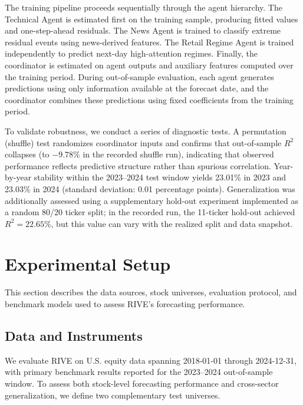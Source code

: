\documentclass[review]{elsarticle}
\begin{document}
The training pipeline proceeds sequentially through the agent hierarchy. The Technical Agent is estimated first on the training sample, producing fitted values and one-step-ahead residuals. The News Agent is trained to classify extreme residual events using news-derived features. The Retail Regime Agent is trained independently to predict next-day high-attention regimes. Finally, the coordinator is estimated on agent outputs and auxiliary features computed over the training period. During out-of-sample evaluation, each agent generates predictions using only information available at the forecast date, and the coordinator combines these predictions using fixed coefficients from the training period. %

To validate robustness, we conduct a series of diagnostic tests. A permutation (shuffle) test randomizes coordinator inputs and confirms that out-of-sample $R^2$ collapses (to $-9.78\%$ in the recorded shuffle run), indicating that observed performance reflects predictive structure rather than spurious correlation. %
Year-by-year stability within the 2023--2024 test window yields 23.01\% in 2023 and 23.03\% in 2024 (standard deviation: 0.01 percentage points). %
Generalization was additionally assessed using a supplementary hold-out experiment implemented as a random 80/20 ticker split; in the recorded run, the 11-ticker hold-out achieved $R^2 = 22.65\%$, but this value can vary with the realized split and data snapshot. %

\section{Experimental Setup}\label{experimental-setup}

This section describes the data sources, stock universes, evaluation protocol, and benchmark models used to assess RIVE's forecasting performance.

\subsection{Data and Instruments}\label{data-and-instruments}

We evaluate RIVE on U.S. equity data spanning 2018-01-01 through 2024-12-31, with primary benchmark results reported for the 2023--2024 out-of-sample window. %
To assess both stock-level forecasting performance and cross-sector generalization, we define two complementary test universes.
\end{document}
